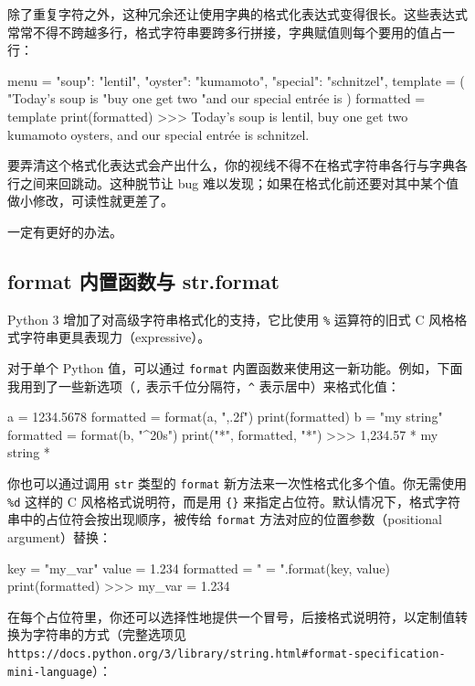除了重复字符之外，这种冗余还让使用字典的格式化表达式变得很长。这些表达式常常不得不跨越多行，格式字符串要跨多行拼接，字典赋值则每个要用的值占一行：

\begin{codebox}[python]
menu = {
    "soup": "lentil",
    "oyster": "kumamoto",
    "special": "schnitzel",
}
template = (
    "Today's soup is %
    "buy one get two %
    "and our special entrée is %
)
formatted = template %
print(formatted)
>>>
Today's soup is lentil, buy one get two kumamoto oysters, and
our special entrée is schnitzel.
\end{codebox}

要弄清这个格式化表达式会产出什么，你的视线不得不在格式字符串各行与字典各行之间来回跳动。这种脱节让 bug 难以发现；如果在格式化前还要对其中某个值做小修改，可读性就更差了。

一定有更好的办法。

\subsection{format 内置函数与 str.format}

Python 3 增加了对高级字符串格式化的支持，它比使用 \texttt{\%} 运算符的旧式 C 风格格式字符串更具表现力（expressive）。

对于单个 Python 值，可以通过 \texttt{format} 内置函数来使用这一新功能。例如，下面我用到了一些新选项（\texttt{,} 表示千位分隔符，\texttt{\^{}} 表示居中）来格式化值：

\begin{codebox}[python]
a = 1234.5678
formatted = format(a, ",.2f")
print(formatted)
b = "my string"
formatted = format(b, "^20s")
print("*", formatted, "*")
>>>
1,234.57
*      my string       *
\end{codebox}

你也可以通过调用 \texttt{str} 类型的 \texttt{format} 新方法来一次性格式化多个值。你无需使用 \texttt{\%d} 这样的 C 风格格式说明符，而是用 \texttt{\{\}} 来指定占位符。默认情况下，格式字符串中的占位符会按出现顺序，被传给 \texttt{format} 方法对应的位置参数（positional argument）替换：

\begin{codebox}[python]
key = "my_var"
value = 1.234
formatted = "{} = {}".format(key, value)
print(formatted)
>>>
my_var = 1.234
\end{codebox}

在每个占位符里，你还可以选择性地提供一个冒号，后接格式说明符，以定制值转换为字符串的方式（完整选项见 \texttt{https://docs.python.org/3/library/string.html\#format-specification-mini-language}）：

